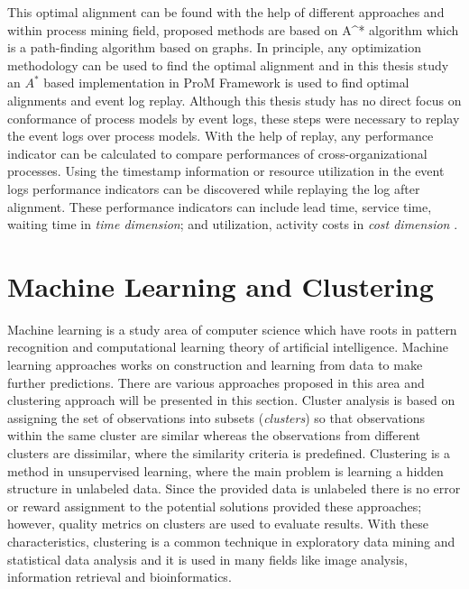 This optimal alignment can be found with the help of different approaches and within process mining field, proposed methods \cite{adriansyah2011conformance} \cite{adriansyah2011towards} are based on A^{*} algorithm which is a path-finding algorithm based on graphs. In principle, any optimization methodology can be used to find the optimal alignment and in this thesis study an $A^{*}$ based implementation in ProM Framework \cite{verbeek2010prom} is used to find optimal alignments and event log replay. Although this thesis study has no direct focus on conformance of process models by event logs, these steps were necessary to replay the event logs over process models. With the help of replay, any performance indicator can be calculated to compare performances of cross-organizational processes. Using the timestamp information or resource utilization in the event logs performance indicators can be discovered while replaying the log after alignment. These performance indicators can include lead time, service time, waiting time in \textit{time dimension}; and utilization, activity costs in \textit{cost dimension} \cite{van2011process}.

\section{Machine Learning and Clustering}
\label{sec:unsupervised-learning}
Machine learning is a study area of computer science which have roots in pattern recognition and computational learning theory of artificial intelligence. Machine learning approaches works on construction and learning from data to make further predictions. There are various approaches proposed in this area and clustering approach will be presented in this section. Cluster analysis is based on assigning the set of observations into subsets (\textit{clusters}) so that observations within the same cluster are similar whereas the observations from different clusters are dissimilar, where the similarity criteria is predefined. Clustering is a method in unsupervised learning, where the main problem is learning a hidden structure in unlabeled data. Since the provided data is unlabeled there is no error or reward assignment to the potential solutions provided these approaches; however, quality metrics on clusters are used to evaluate results. With these characteristics, clustering is a common technique in exploratory data mining and statistical data analysis and it is used in many fields like image analysis, information retrieval and bioinformatics.

